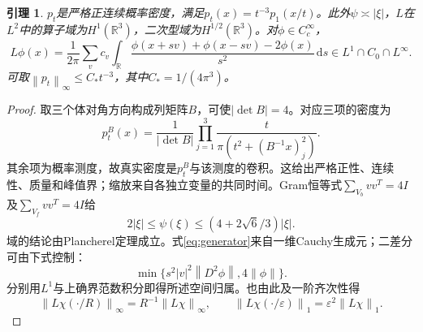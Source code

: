 \documentclass[UTF8,11pt,a4paper,fontset=fandol]{ctexart}
\newtheorem{lemma}[theorem]{引理}
\theoremstyle{definition}\newtheorem{definition}[theorem]{定义}
\theoremstyle{remark}\newtheorem{remark}[theorem]{注}
\newcommand{\R}{\mathbb R}
\newcommand{\dd}{\,\mathrm d}
\newcommand{\norm}[1]{\left\lVert#1\right\rVert}
\newcommand{\abs}[1]{\left|#1\right|}
\begin{document}
\begin{lemma}\label{lem:semigroup}
$p_t$是严格正连续概率密度，满足$p_t(x)=t^{-3}p_1(x/t)$。此外$\psi\asymp\abs\xi$，$L$在$L^2$中的算子域为$H^1(\R^3)$，二次型域为$H^{1/2}(\R^3)$。对$\phi\in C_c^\infty$，
\begin{equation}\label{eq:generator}
 L\phi(x)=\frac1{2\pi}\sum_vc_v\int_\R
 \frac{\phi(x+sv)+\phi(x-sv)-2\phi(x)}{s^2}\dd s
 \in L^1\cap C_0\cap L^\infty.
\end{equation}
可取$\norm{p_t}_\infty\le C_*t^{-3}$，其中$C_*=1/(4\pi^3)$。
\end{lemma}
\begin{proof}
取三个体对角方向构成列矩阵$B$，可使$\abs{\det B}=4$。对应三项的密度为
\[
 p_t^B(x)=\frac1{\abs{\det B}}\prod_{j=1}^3
 \frac{t}{\pi(t^2+(B^{-1}x)_j^2)}.
\]
其余项为概率测度，故真实密度是$p_t^B$与该测度的卷积。这给出严格正性、连续性、质量和峰值界；缩放来自各独立变量的共同时间。Gram恒等式$\sum_{V_b}vv^T=4I$及$\sum_{V_f}vv^T=4I$给
\[
 2\abs\xi\le\psi(\xi)\le(4+2\sqrt6/3)\abs\xi.
\]
域的结论由Plancherel定理成立。式\eqref{eq:generator}来自一维Cauchy生成元；二差分可由下式控制：
\[\min\{s^2\abs v^2\norm{D^2\phi},4\norm\phi\}.\]
分别用$L^1$与上确界范数积分即得所述空间归属。也由此及一阶齐次性得
\begin{equation}\label{eq:cutoff}
 \norm{L\chi(\cdot/R)}_\infty=R^{-1}\norm{L\chi}_\infty,
 \qquad \norm{L\chi(\cdot/\varepsilon)}_1
       =\varepsilon^2\norm{L\chi}_1.
\end{equation}
\end{proof}
\end{document}
